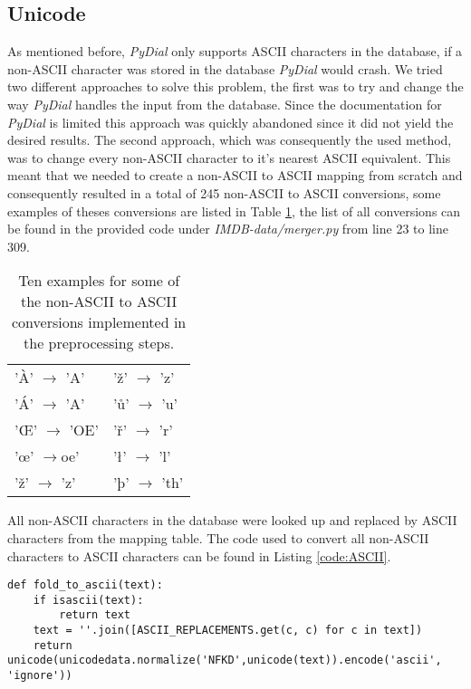 \documentclass[11pt,a4paper]{article}
\begin{document}
	\subsection{Unicode}
	\label{sec:pydialUnicode}
	As mentioned before, \emph{PyDial} only supports ASCII characters in the database, if a non-ASCII character was stored in the database \emph{PyDial} would crash. We tried two different approaches to solve this problem, the first was to try and change the way \emph{PyDial} handles the input from the database. Since the documentation for \emph{PyDial} is limited this approach was quickly abandoned since it did not yield the desired results. The second approach, which was consequently the used method, was to change every non-ASCII character to it's nearest ASCII equivalent. This meant that we needed to create a non-ASCII to ASCII mapping from scratch and consequently resulted in a total of 245 non-ASCII to ASCII conversions, some examples of theses conversions are listed in Table \ref{tab:ASCIIExamples}, the list of all conversions can be found in the provided code under \emph{IMDB-data/merger.py} from line 23 to line 309.
	
	\begin{table}[h]
	\centering
		\begin{tabular}{l|l}
			\toprule[0.5mm]
			'À' $\rightarrow$ 'A' & 'ž' $\rightarrow$ 'z'\\[0.7mm]
			'Á' $\rightarrow$ 'A' & 'ů' $\rightarrow$ 'u'\\[0.7mm]
			'Œ' $\rightarrow$ 'OE' & 'ř' $\rightarrow$ 'r'\\[0.7mm]
			'œ' $\rightarrow$oe' & 'ł' $\rightarrow$ 'l' \\[0.7mm]
			'ž' $\rightarrow$ 'z' & 'þ' $\rightarrow$ 'th'\\[0.7mm]
			\bottomrule[0.5mm]
		\end{tabular}
		\caption{Ten examples for some of the non-ASCII to ASCII conversions implemented in the preprocessing steps.}
		\label{tab:ASCIIExamples}
	\end{table}
	
	All non-ASCII characters in the database were looked up and replaced by ASCII characters from the mapping table. The code used to convert all non-ASCII characters to ASCII characters can be found in Listing \ref{code:ASCII}.
	
	\begin{lstlisting}[float,caption=Converting non-ASCII characters to ASCII characters., label=code:ASCII]
def fold_to_ascii(text):
	if isascii(text):
		return text
	text = ''.join([ASCII_REPLACEMENTS.get(c, c) for c in text])
	return unicode(unicodedata.normalize('NFKD',unicode(text)).encode('ascii', 'ignore'))
	\end{lstlisting}
	
\end{document}
